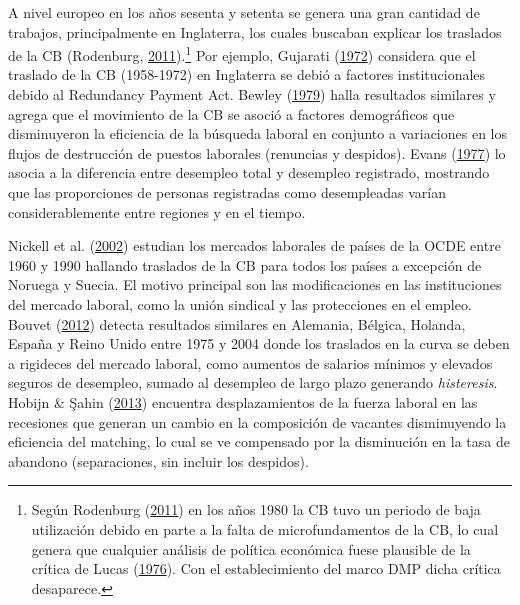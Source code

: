 \documentclass[12pt,oneside]{reedthesis}
\begin{document}
A nivel europeo en los años sesenta y setenta se genera una gran cantidad de trabajos, principalmente en Inglaterra, los cuales buscaban explicar los traslados de la CB (Rodenburg, \protect\hyperlink{ref-Rodenburg2007}{2011}).\footnote{Según Rodenburg (\protect\hyperlink{ref-Rodenburg2007}{2011}) en los años 1980 la CB tuvo un periodo de baja utilización debido en parte a la falta de microfundamentos de la CB, lo cual genera que cualquier análisis de política económica fuese plausible de la crítica de Lucas (\protect\hyperlink{ref-Lucas1976}{1976}). Con el establecimiento del marco DMP dicha crítica desaparece.} Por ejemplo, Gujarati (\protect\hyperlink{ref-Gujarati1972}{1972}) considera que el traslado de la CB (1958-1972) en Inglaterra se debió a factores institucionales debido al Redundancy Payment Act. Bewley (\protect\hyperlink{ref-Bewley1979}{1979}) halla resultados similares y agrega que el movimiento de la CB se asoció a factores demográficos que disminuyeron la eficiencia de la búsqueda laboral en conjunto a variaciones en los flujos de destrucción de puestos laborales (renuncias y despidos). Evans (\protect\hyperlink{ref-Evans1977}{1977}) lo asocia a la diferencia entre desempleo total y desempleo registrado, mostrando que las proporciones de personas registradas como desempleadas varían considerablemente entre regiones y en el tiempo.

Nickell et al. (\protect\hyperlink{ref-Nickell2002}{2002}) estudian los mercados laborales de países de la OCDE entre 1960 y 1990 hallando traslados de la CB para todos los países a excepción de Noruega y Suecia. El motivo principal son las modificaciones en las instituciones del mercado laboral, como la unión sindical y las protecciones en el empleo. Bouvet (\protect\hyperlink{ref-Bouvet2012}{2012}) detecta resultados similares en Alemania, Bélgica, Holanda, España y Reino Unido entre 1975 y 2004 donde los traslados en la curva se deben a rigideces del mercado laboral, como aumentos de salarios mínimos y elevados seguros de desempleo, sumado al desempleo de largo plazo generando \emph{histeresis}. Hobijn \& Şahin (\protect\hyperlink{ref-Hobijn2013}{2013}) encuentra desplazamientos de la fuerza laboral en las recesiones que generan un cambio en la composición de vacantes disminuyendo la eficiencia del matching, lo cual se ve compensado por la disminución en la tasa de abandono (separaciones, sin incluir los despidos).
\end{document}
